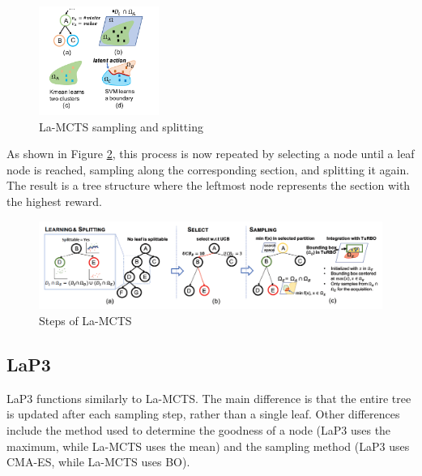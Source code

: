 \documentclass[bibliography=totoc]{scrartcl}
\begin{document}
\begin{figure}[H]
	\centering
	\includegraphics[width = {0.35\textwidth}]{img/lamcts_1.png}
	\caption{\ac{La-MCTS} sampling and splitting \cite[p.3]{La-MCTS}}
	\label{fig:laMCTS_sampling_splitting}
    \vspace{-20pt}
\end{figure}
As shown in Figure \ref{fig:laMCTS_workflow}, this process is now repeated by selecting a node until a leaf node is reached, sampling along the corresponding section, and splitting it again.
The result is a tree structure where the leftmost node represents the section with the highest reward. 

\begin{figure}[H]
	\centering
	\includegraphics[width = {\textwidth}]{img/lamcts_workflow.png}
	\caption{Steps of \ac{La-MCTS} \cite[p.4]{La-MCTS}}
	\label{fig:laMCTS_workflow}
    \vspace{-20pt}
\end{figure}

\subsection{LaP3}
\ac{LaP3} functions similarly to \ac{La-MCTS}. The main difference is that the entire tree is updated after each sampling step, rather than a single leaf. Other differences include the method used to determine the goodness of a node (\ac{LaP3} uses the maximum, while \ac{La-MCTS} uses the mean) and the sampling method (\ac{LaP3} uses \ac{CMA-ES}, while \ac{La-MCTS} uses \ac{BO}). \cite{NEURIPS2021_03a3655f} \cite{La-MCTS}

\end{document}
